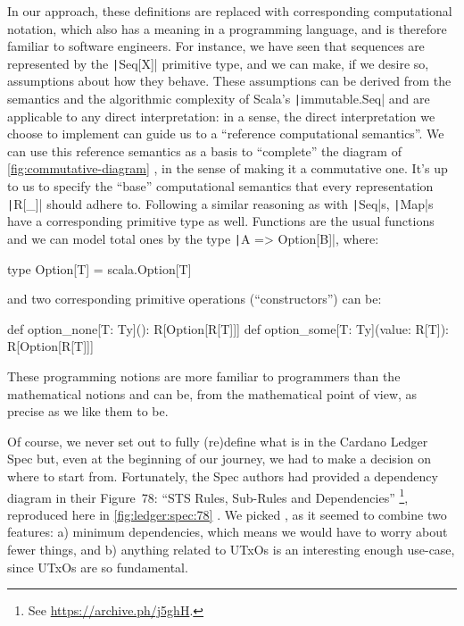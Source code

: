 \documentclass[11pt]{article}
\renewcommand{\vref}[1]{\autoref{#1} \vpageref{#1}}{}
\newcommand{\ScalaI}[1]{\texttt|#1|}
\begin{document}
In our approach, these definitions are replaced with corresponding computational notation, which also has a meaning in a programming language, and is therefore familiar to software engineers. For instance, we have seen that sequences are represented by the \ScalaI{Seq[X]} primitive type, and we can make, if we desire so, assumptions about how they behave. These assumptions can be derived from the semantics and the algorithmic complexity of Scala's \ScalaI{immutable.Seq} and are applicable to any direct interpretation: in a sense, the direct interpretation we choose to implement can guide us to a ``reference computational semantics''. We can use this reference semantics as a basis to ``complete'' the diagram of \vref{fig:commutative-diagram}, in the sense of making it a commutative one. It's up to us to specify the ``base'' computational semantics that every representation \ScalaI{R[_]} should adhere to.  Following a similar reasoning as with \ScalaI{Seq}s, \ScalaI{Map}s have a corresponding primitive type as well. Functions are the usual functions and we can model total ones by the type \ScalaI{A => Option[B]}, where:

\begin{ScalaBlockSimple}
type Option[T] = scala.Option[T]
\end{ScalaBlockSimple}

\noindent and two corresponding primitive operations (``constructors'') can be:

\begin{ScalaBlockSimple}
  def option_none[T: Ty](): R[Option[R[T]]]
  def option_some[T: Ty](value: R[T]): R[Option[R[T]]]
\end{ScalaBlockSimple}

\noindent These programming notions are more familiar to programmers than the mathematical notions and can be, from the mathematical point of view, as precise as we like them to be.


Of course, we never set out to fully (re)define what is in the Cardano Ledger Spec but, even at the beginning of our journey, we had to make a decision on where to start from. Fortunately, the Spec authors had provided a dependency diagram in their Figure~78: ``STS Rules, Sub-Rules and Dependencies''%
\footnote{See \href{https://archive.ph/j5ghH}{https://archive.ph/j5ghH}.}, reproduced here in \vref{fig:ledger:spec:78}. We picked , as it seemed to combine two features: a) minimum dependencies, which means we would have to worry about fewer things, and b) anything related to \textsf{UTxOs} is an interesting enough use-case, since \textsf{UTxOs} are so fundamental.
\end{document}
